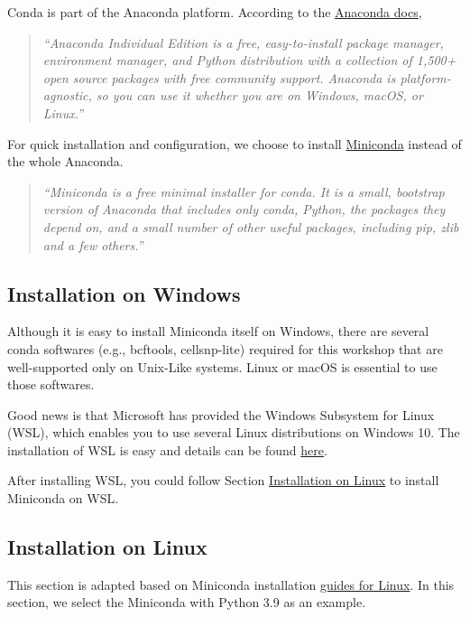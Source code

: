 \documentclass[
]{book}
\begin{document}
Conda is part of the Anaconda platform. According to the \href{https://docs.anaconda.com/\#anaconda-individual-edition}{Anaconda docs},

\begin{quote}
\emph{``Anaconda Individual Edition is a free, easy-to-install package manager, environment manager, and Python distribution with a collection of 1,500+ open source packages with free community support. Anaconda is platform-agnostic, so you can use it whether you are on Windows, macOS, or Linux.''}
\end{quote}

For quick installation and configuration, we choose to install \href{https://docs.conda.io/en/latest/miniconda.html}{Miniconda} instead of the whole Anaconda.

\begin{quote}
\emph{``Miniconda is a free minimal installer for conda. It is a small, bootstrap version of Anaconda that includes only conda, Python, the packages they depend on, and a small number of other useful packages, including pip, zlib and a few others.''}
\end{quote}

\hypertarget{conda_install_windows}{%
\subsection{Installation on Windows}\label{conda_install_windows}}

Although it is easy to install Miniconda itself on Windows, there are several conda softwares (e.g., bcftools, cellsnp-lite) required for this workshop that are well-supported only on Unix-Like systems. Linux or macOS is essential to use those softwares.

Good news is that Microsoft has provided the Windows Subsystem for Linux (WSL), which enables you to use several Linux distributions on Windows 10. The installation of WSL is easy and details can be found \protect\hyperlink{wsl_install}{here}.

After installing WSL, you could follow Section \protect\hyperlink{conda_install_linux}{Installation on Linux} to install Miniconda on WSL.

\hypertarget{conda_install_linux}{%
\subsection{Installation on Linux}\label{conda_install_linux}}

This section is adapted based on Miniconda installation \href{https://conda.io/projects/conda/en/latest/user-guide/install/linux.html}{guides for Linux}. In this section, we select the Miniconda with Python 3.9 as an example.
\end{document}
